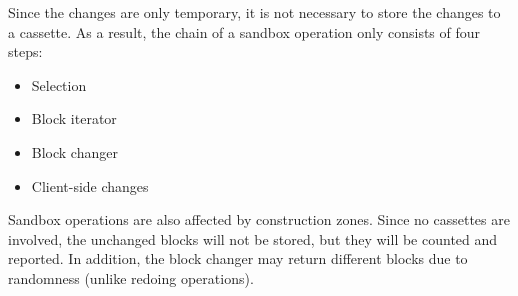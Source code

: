 \documentclass{report}
\begin{document}
			Since the changes are only temporary, it is not necessary to store the changes to a cassette. As a result,
			the chain of a sandbox operation only consists of four steps:

			\begin{itemize}
				\item Selection
				\item Block iterator
				\item Block changer
				\item Client-side changes
			\end{itemize}

			Sandbox operations are also affected by construction zones. Since no cassettes are involved, the unchanged
			blocks will not be stored, but they will be counted and reported. In addition, the block changer may return
			different blocks due to randomness (unlike redoing operations).

	
\end{document}
